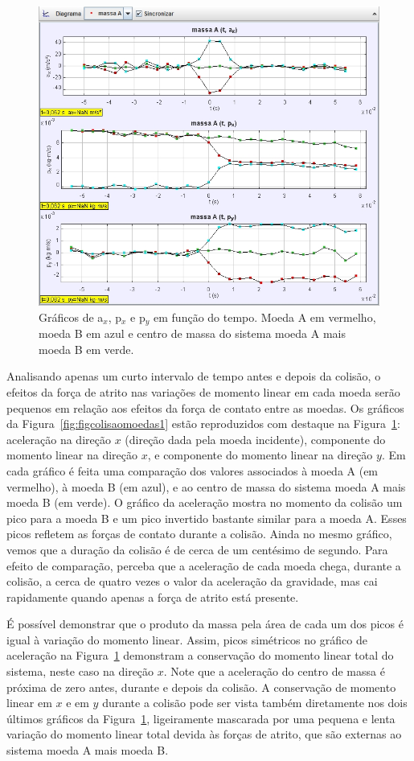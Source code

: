 \begin{figure}
\centering
\includegraphics[width=0.7\columnwidth]{Figuras_exp4/figcolisaomoedas2.jpg}
\caption{\label{fig:figcolisaomoedas2} Gráficos de a$_x$, p$_x$ e p$_y$ em função do tempo. Moeda A em vermelho, moeda B em azul e  centro de massa do sistema moeda A mais moeda B em verde. }
\end{figure}
Analisando apenas um curto intervalo de tempo antes e depois da colisão, o efeitos da força de atrito nas variações de momento linear em cada moeda serão pequenos em relação aos efeitos da força de contato entre as moedas. Os gráficos da Figura~\ref{fig:figcolisaomoedas1} estão reproduzidos com destaque na Figura~\ref{fig:figcolisaomoedas2}: aceleração na direção $x$ (direção dada pela moeda incidente), componente do momento linear na direção $x$, e componente do momento linear na direção $y$. Em cada gráfico é feita uma comparação dos valores associados à moeda A (em vermelho), à moeda B (em azul), e ao centro de massa do sistema moeda A mais moeda B (em verde). O gráfico da aceleração mostra no momento da colisão um pico para a moeda B e um pico invertido bastante similar para a moeda A. Esses picos refletem as forças de contato durante a colisão. Ainda no mesmo gráfico, vemos que a duração da colisão é de cerca de um centésimo de segundo. Para efeito de comparação, perceba que a aceleração de cada moeda chega, durante a colisão, a cerca de quatro vezes o valor da aceleração da gravidade, mas cai rapidamente quando apenas a força de atrito está presente. 

É possível demonstrar que o produto da massa pela área de cada um dos picos é igual à variação do momento linear. Assim, picos simétricos no gráfico de aceleração na Figura~\ref{fig:figcolisaomoedas2} demonstram a conservação do momento linear total do sistema, neste caso na direção $x$. Note que a aceleração do centro de massa é próxima de zero antes, durante e depois da colisão. A conservação de momento linear em $x$ e em $y$ durante a colisão pode ser vista também diretamente nos dois últimos gráficos da Figura~\ref{fig:figcolisaomoedas2}, ligeiramente mascarada por uma pequena e lenta variação do momento linear total devida às forças de atrito, que são externas ao sistema moeda A mais moeda B.


